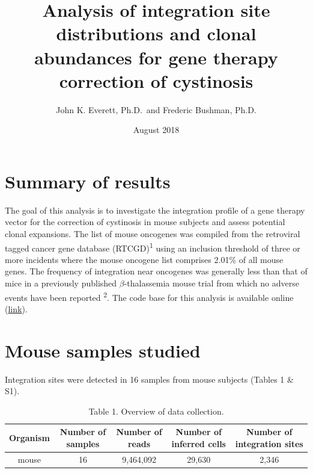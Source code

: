 \documentclass[12pt,]{article}
\title{Analysis of integration site distributions and clonal abundances for
gene therapy correction of cystinosis}
\author{John K. Everett, Ph.D.~and Frederic Bushman, Ph.D.}
\date{August 2018}
\begin{document}
\maketitle

{
\setcounter{tocdepth}{2}
\tableofcontents
}
\captionsetup[table]{labelformat=empty}

\newpage

\section{Summary of results}\label{summary-of-results}

The goal of this analysis is to investigate the integration profile of a
gene therapy vector for the correction of cystinosis in mouse subjects
and assess potential clonal expansions. The list of mouse oncogenes was
compiled from the retroviral tagged cancer gene database
(RTCGD)\textsuperscript{1} using an inclusion threshold of three or more
incidents where the mouse oncogene list comprises 2.01\% of all mouse
genes. The frequency of integration near oncogenes was generally less
than that of mice in a previously published \(\beta\)-thalassemia mouse
trial from which no adverse events have been reported
\textsuperscript{2}. The code base for this analysis is available online
(\href{https://github.com/everettJK/project.geneTherapy.ucsdMouseCystinosis}{link}).

\vspace{0.1cm}

\section{Mouse samples studied}\label{mouse-samples-studied}

Integration sites were detected in 16 samples from mouse subjects
(Tables 1 \& S1).

\vspace{0.1cm}

\begin{table}[!h]

\caption{\label{tab:unnamed-chunk-2}Table 1. Overview of data collection.}
\centering
\begin{tabular}[t]{ccccc}
\toprule
Organism & Number of samples & Number of reads & Number of inferred cells & Number of integration sites\\
\midrule
mouse & 16 & 9,464,092 & 29,630 & 2,346\\
\bottomrule
\end{tabular}
\end{table}
\end{document}
